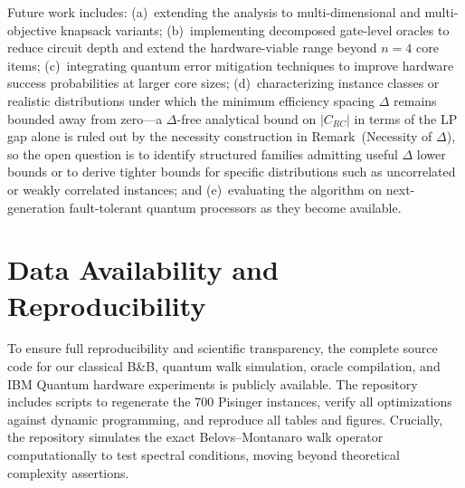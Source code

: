 \documentclass[conference]{IEEEtran} \IEEEoverridecommandlockouts
\begin{document}
Future work includes: (a)~extending the analysis to multi-dimensional and multi-objective knapsack variants; (b)~implementing decomposed gate-level oracles to reduce circuit depth and extend the hardware-viable range beyond $n = 4$ core items; (c)~integrating quantum error mitigation techniques to improve hardware success probabilities at larger core sizes; (d)~characterizing instance classes or realistic distributions under which the minimum efficiency spacing $\Delta$ remains bounded away from zero---a $\Delta$-free analytical bound on $|C_{RC}|$ in terms of the LP gap alone is ruled out by the necessity construction in Remark~(Necessity of $\Delta$), so the open question is to identify structured families admitting useful $\Delta$ lower bounds or to derive tighter bounds for specific distributions such as uncorrelated or weakly correlated instances; and (e)~evaluating the algorithm on next-generation fault-tolerant quantum processors as they become available.




\section{Data Availability and Reproducibility}

To ensure full reproducibility and scientific transparency, the complete source code for our classical B\&B, quantum walk simulation, oracle compilation, and IBM Quantum hardware experiments is publicly available. The repository includes scripts to regenerate the 700 Pisinger instances, verify all optimizations against dynamic programming, and reproduce all tables and figures. Crucially, the repository simulates the exact Belovs--Montanaro walk operator computationally to test spectral conditions, moving beyond theoretical complexity assertions.










 
\end{document}
